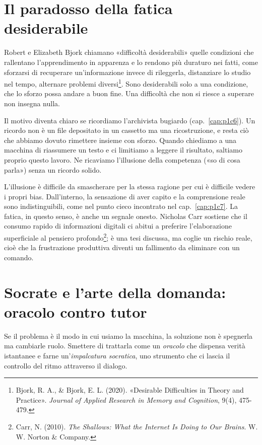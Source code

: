 \section{Il paradosso della fatica desiderabile}

Robert e Elizabeth Bjork chiamano «difficoltà desiderabili» quelle condizioni che rallentano l'apprendimento in apparenza e lo rendono più duraturo nei fatti, come sforzarsi di recuperare un'informazione invece di rileggerla, distanziare lo studio nel tempo, alternare problemi diversi\footnote{Bjork, R. A., \& Bjork, E. L. (2020). «Desirable Difficulties in Theory and Practice». \textit{Journal of Applied Research in Memory and Cognition}, 9(4), 475-479.}. Sono desiderabili solo a una condizione, che lo sforzo possa andare a buon fine. Una difficoltà che non si riesce a superare non insegna nulla.

Il motivo diventa chiaro se ricordiamo l'archivista bugiardo (cap.~\ref{cap:p1c6}). Un ricordo non è un file depositato in un cassetto ma una ricostruzione, e resta ciò che abbiamo dovuto rimettere insieme con sforzo. Quando chiediamo a una macchina di riassumere un testo e ci limitiamo a leggere il risultato, saltiamo proprio questo lavoro. Ne ricaviamo l'illusione della competenza («so di cosa parla») senza un ricordo solido.

L'illusione è difficile da smascherare per la stessa ragione per cui è difficile vedere i propri bias. Dall'interno, la sensazione di aver capito e la comprensione reale sono indistinguibili, come nel punto cieco incontrato nel cap.~\ref{cap:p1c7}. La fatica, in questo senso, è anche un segnale onesto. Nicholas Carr sostiene che il consumo rapido di informazioni digitali ci abitui a preferire l'elaborazione superficiale al pensiero profondo\footnote{Carr, N. (2010). \textit{The Shallows: What the Internet Is Doing to Our Brains}. W. W. Norton \& Company.}; è una tesi discussa, ma coglie un rischio reale, cioè che la frustrazione produttiva diventi un fallimento da eliminare con un comando.

\section{Socrate e l'arte della domanda: oracolo contro tutor}

Se il problema è il modo in cui usiamo la macchina, la soluzione non è spegnerla ma cambiarle ruolo. Smettere di trattarla come un \textit{oracolo} che dispensa verità istantanee e farne un'\textit{impalcatura socratica}, uno strumento che ci lascia il controllo del ritmo attraverso il dialogo.

